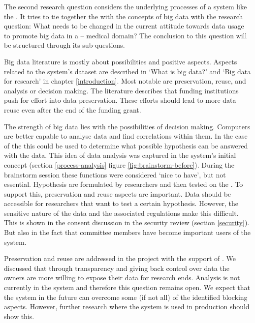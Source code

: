 The second research question considers the underlying processes of a system like the \ivfsystem{}.
It tries to tie together the \projectdata{} with the concepts of big data with the research question: What needs to be changed in the current attitude towards data usage to promote big data in a \IVF{}--\PRN{} medical domain?
The conclusion to this question will be structured through its sub-questions.

Big data literature is mostly about possibilities and positive aspects.
Aspects related to the system's dataset are described in `What is big data?' and `Big data for \project{} research' in chapter \ref{introduction}.
Most notable are preservation, reuse, and analysis or decision making.
The literature describes that funding institutions push for effort into data preservation.
These efforts should lead to more data reuse even after the end of the funding grant.

The strength of big data lies with the possibilities of decision making.
Computers are better capable to analyse data and find correlations within them.
In the case of the \project{} this could be used to determine what possible hypothesis can be answered with the data.
This idea of data analysis was captured in the system's initial concept (section \ref{process-analysis} figure \ref{fig:brainstorm-before}).
During the brainstorm session these functions were considered `nice to have', but not essential.
Hypothesis are formulated by researchers and then tested on the \projectdata{}.
To support this,  preservation and reuse aspects are important.
Data should be accessible for researchers that want to test a certain hypothesis.
However, the sensitive nature of the data and the associated regulations make this difficult.
This is shown in the consent discussion in the security review (section \ref{security}).
But also in the fact that committee members have become  important users of the system.

Preservation and reuse are addressed in the \project{} project with the support of \ivfsystem{}.
We discussed that through transparency and giving back control over data the owners are more willing to expose their data for research ends.
Analysis is not currently in the system and therefore this question remains open.
We expect that the system in the future can overcome some (if not all) of the identified blocking aspects.
However, further research where the system is used in production should show this.